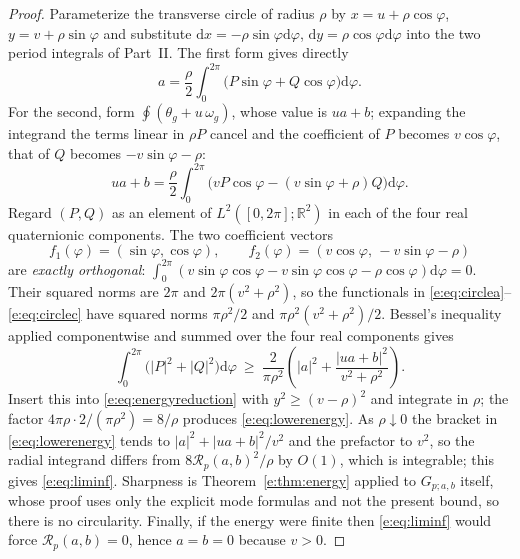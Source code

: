 \documentclass[11pt,a4paper]{article}
\numberwithin{equation}{section}
\theoremstyle{definition}
\theoremstyle{remark}
\theoremstyle{plain}
\newcommand{\RR}{\mathbb R}
\newcommand{\om}{\omega}
\newcommand{\thet}{\theta}
\newcommand{\Rp}{\mathcal R_{p}}      %
\newcommand{\abs}[1]{\lvert #1\rvert}
\newcommand{\dd}{\mathrm d}
\begin{document}
\begin{proof}
Parameterize the transverse circle of radius $\rho$ by
$x=u+\rho\cos\varphi$, $y=v+\rho\sin\varphi$ and substitute
$\dd x=-\rho\sin\varphi\dd\varphi$, $\dd y=\rho\cos\varphi\dd\varphi$
into the two period integrals of Part~II. The first form gives
directly
\begin{equation}
 a=\frac\rho2\int_0^{2\pi}\bigl(P\sin\varphi+Q\cos\varphi\bigr)\dd\varphi .
 \label{e:eq:circlea}
\end{equation}
For the second, form $\oint(\thet_g+u\,\om_g)$, whose value is $ua+b$;
expanding the integrand the terms linear in $\rho P$ cancel and the
coefficient of $P$ becomes $v\cos\varphi$, that of $Q$ becomes
$-v\sin\varphi-\rho$:
\begin{equation}
 ua+b=\frac\rho2\int_0^{2\pi}
   \bigl(vP\cos\varphi-(v\sin\varphi+\rho)Q\bigr)\dd\varphi .
 \label{e:eq:circlec}
\end{equation}
Regard $(P,Q)$ as an element of $L^2([0,2\pi];\RR^2)$ in each of the four
real quaternionic components. The two coefficient vectors
\[
 f_1(\varphi)=(\sin\varphi,\cos\varphi),
 \qquad
 f_2(\varphi)=(v\cos\varphi,\,-v\sin\varphi-\rho)
\]
are \emph{exactly orthogonal}:
$\int_0^{2\pi}(v\sin\varphi\cos\varphi-v\sin\varphi\cos\varphi
-\rho\cos\varphi)\dd\varphi=0$. Their squared norms are $2\pi$ and
$2\pi(v^2+\rho^2)$, so the functionals in
\eqref{e:eq:circlea}--\eqref{e:eq:circlec} have squared norms
$\pi\rho^2/2$ and $\pi\rho^2(v^2+\rho^2)/2$. Bessel's inequality applied
componentwise and summed over the four real components gives
\begin{equation}
 \int_0^{2\pi}\bigl(\abs P^2+\abs Q^2\bigr)\dd\varphi
 \ \ge\ \frac2{\pi\rho^2}
   \left(\abs a^2+\frac{\abs{ua+b}^2}{v^2+\rho^2}\right).
 \label{e:eq:bessel}
\end{equation}
Insert this into \eqref{e:eq:energyreduction} with $y^2\ge(v-\rho)^2$ and
integrate in $\rho$; the factor $4\pi\rho\cdot2/(\pi\rho^2)=8/\rho$
produces \eqref{e:eq:lowerenergy}. As $\rho\downarrow0$ the bracket in
\eqref{e:eq:lowerenergy} tends to $\abs a^2+\abs{ua+b}^2/v^2$ and the
prefactor to $v^2$, so the radial integrand differs from
$8\Rp(a,b)^2/\rho$ by $O(1)$, which is integrable; this gives
\eqref{e:eq:liminf}. Sharpness is Theorem~\ref{e:thm:energy} applied to
$G_{p;a,b}$ itself, whose proof uses only the explicit mode formulas and
not the present bound, so there is no circularity. Finally, if the energy
were finite then \eqref{e:eq:liminf} would force $\Rp(a,b)=0$, hence
$a=b=0$ because $v>0$.
\end{proof}
\end{document}
